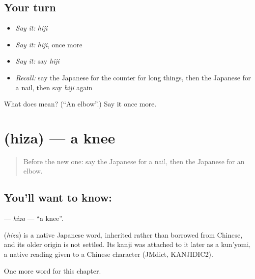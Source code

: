 \subsection*{Your turn}
\begin{itemize}
\raggedright
  \item \emph{Say it:} \emph{hiji}
  \item \emph{Say it:} \emph{hiji}, once more
  \item \emph{Say it:} say \emph{hiji}
  \item \emph{Recall:} say the Japanese for the counter for long things, then the Japanese for a nail, then say \emph{hiji} again
\end{itemize}

\begin{tcolorbox}[breakable,colback=teal!4,colframe=teal!35!black,title={Before you move on}]
What does  mean? (\textquotedblleft{}An elbow\textquotedblright{}.) Say it once more.
\end{tcolorbox}
\section[\texorpdfstring{\ja{ひざ} (hiza)}{ひざ (hiza)}]{ (hiza) — a knee}

\label{lesson:JA-C20-hiza}



\begin{quote}
Before the new one: say the Japanese for a nail, then the Japanese for an elbow.
\end{quote}

\subsection*{You'll want to know: }
\textbf{} — \emph{hiza} — \textquotedblleft{}a knee\textquotedblright{}.

\begin{cousinweb}
\textbf{} (\emph{hiza}) is a native Japanese word, inherited rather than borrowed from Chinese, and its older origin is not settled. Its kanji was attached to it later as a kun'yomi, a native reading given to a Chinese character (JMdict, KANJIDIC2).
\end{cousinweb}

\begin{grammarlens}[title={What you've built}]
One more word for this chapter.
\end{grammarlens}

